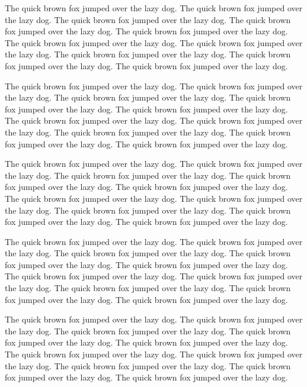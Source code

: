 \documentclass[
  12pt]{article}
\begin{document}
The quick brown fox jumped over the lazy dog. The quick brown fox jumped
over the lazy dog. The quick brown fox jumped over the lazy dog. The
quick brown fox jumped over the lazy dog. The quick brown fox jumped
over the lazy dog. The quick brown fox jumped over the lazy dog. The
quick brown fox jumped over the lazy dog. The quick brown fox jumped
over the lazy dog. The quick brown fox jumped over the lazy dog. The
quick brown fox jumped over the lazy dog.

The quick brown fox jumped over the lazy dog. The quick brown fox jumped
over the lazy dog. The quick brown fox jumped over the lazy dog. The
quick brown fox jumped over the lazy dog. The quick brown fox jumped
over the lazy dog. The quick brown fox jumped over the lazy dog. The
quick brown fox jumped over the lazy dog. The quick brown fox jumped
over the lazy dog. The quick brown fox jumped over the lazy dog. The
quick brown fox jumped over the lazy dog.

The quick brown fox jumped over the lazy dog. The quick brown fox jumped
over the lazy dog. The quick brown fox jumped over the lazy dog. The
quick brown fox jumped over the lazy dog. The quick brown fox jumped
over the lazy dog. The quick brown fox jumped over the lazy dog. The
quick brown fox jumped over the lazy dog. The quick brown fox jumped
over the lazy dog. The quick brown fox jumped over the lazy dog. The
quick brown fox jumped over the lazy dog.

\addtolength{\textheight}{-.5in}%

\addtolength{\textheight}{.2in}%

The quick brown fox jumped over the lazy dog. The quick brown fox jumped
over the lazy dog. The quick brown fox jumped over the lazy dog. The
quick brown fox jumped over the lazy dog. The quick brown fox jumped
over the lazy dog. The quick brown fox jumped over the lazy dog. The
quick brown fox jumped over the lazy dog. The quick brown fox jumped
over the lazy dog. The quick brown fox jumped over the lazy dog. The
quick brown fox jumped over the lazy dog.

The quick brown fox jumped over the lazy dog. The quick brown fox jumped
over the lazy dog. The quick brown fox jumped over the lazy dog. The
quick brown fox jumped over the lazy dog. The quick brown fox jumped
over the lazy dog. The quick brown fox jumped over the lazy dog. The
quick brown fox jumped over the lazy dog. The quick brown fox jumped
over the lazy dog. The quick brown fox jumped over the lazy dog. The
quick brown fox jumped over the lazy dog.
\end{document}
